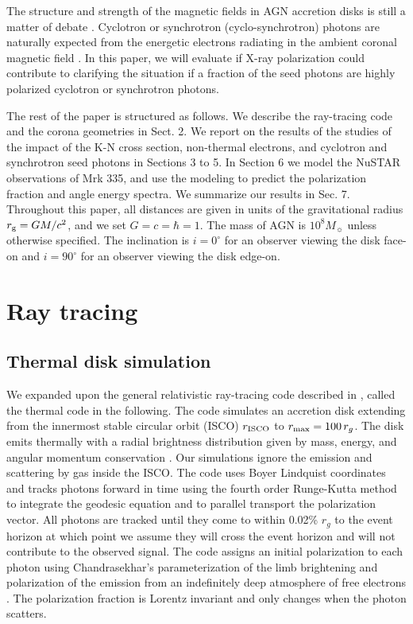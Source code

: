 \documentclass[manuscript]{aastex}
\begin{document}
The structure and strength of the magnetic fields in AGN accretion disks is still a matter of debate \citep[e.g.][]{bel05, bla77}. Cyclotron or synchrotron (cyclo-synchrotron) photons are naturally expected from the energetic electrons radiating in the ambient coronal magnetic field \citep[see e.g.][]{mal09, vel11}. In this paper, we will evaluate if X-ray polarization could contribute to clarifying the situation if a fraction of the seed photons are highly polarized cyclotron or synchrotron photons. 

The rest of the paper is structured as follows. We describe the ray-tracing code and the corona geometries in Sect. 2. We report on the results of the studies of the impact of the K-N cross section, non-thermal electrons, and  cyclotron and synchrotron seed photons in Sections 3 to 5. In Section 6 we model the NuSTAR observations of Mrk 335, and use the modeling to predict the polarization fraction and angle energy spectra. We summarize our results in Sec. 7. Throughout this paper, all distances are given in units of the gravitational radius $r_{\rm g} =GM/c^2$, and we set $G=c=\hbar=1$. The mass of AGN is $10^8 M_{\sun}$ unless otherwise specified. The inclination is $i = 0^{\circ}$ for an observer viewing the disk face-on and $i = 90^{\circ}$ for an observer viewing the disk edge-on.

\section {Ray tracing}\label{sec2}
\subsection{Thermal disk simulation}
We expanded upon the general relativistic ray-tracing code described in \citet{kra12,beh16,hor16}, called the thermal code in the following. The code simulates an accretion disk extending from the innermost stable circular orbit (ISCO) $r_{\rm ISCO}$ to $r_{\rm max}=100\,r_g$. The disk emits thermally with a radial brightness distribution given by mass, energy, and angular momentum conservation \citep{pag74}. Our simulations ignore the emission and scattering by gas inside the ISCO. The code uses Boyer Lindquist coordinates and tracks photons forward in time using the fourth order Runge-Kutta method to integrate the geodesic equation and to parallel transport the polarization vector. All photons are tracked until they come to within 0.02\% $r_g$ to the event horizon at which point we assume they will cross the event horizon and will not contribute to the observed signal. The code assigns an initial polarization to each photon using Chandrasekhar's parameterization of the limb brightening and polarization of the emission from an indefinitely deep atmosphere of free electrons \citep[][Tables 24 and 25]{cha60}. The polarization fraction is Lorentz invariant and only changes when the photon scatters.
\end{document}
